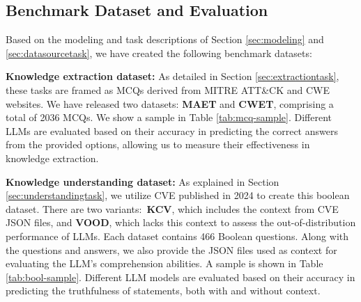 \documentclass[conference]{IEEEtran}
\begin{document}
\subsection{Benchmark Dataset and Evaluation}
Based on the modeling and task descriptions of Section \ref{sec:modeling} and \ref{sec:datasourcetask}, we have created the following benchmark datasets:

\textbf{Knowledge extraction dataset:} As detailed in Section \ref{sec:extractiontask}, these tasks are framed as MCQs derived from MITRE ATT\&CK and CWE websites. We have released two datasets: \textbf{MAET} and \textbf{CWET}, comprising a total of 2036 MCQs. We show a sample in Table \ref{tab:mcq-sample}. Different LLMs are evaluated based on their accuracy in predicting the correct answers from the provided options, allowing us to measure their effectiveness in knowledge extraction.

\begin{table}[]
\caption{Sample from KCV and VOOD dataset}
\label{tab:bool-sample}
\centering
{}
\end{table}

\textbf{Knowledge understanding dataset:} As explained in Section \ref{sec:understandingtask}, we utilize CVE published in 2024 to create this boolean dataset. There are two variants:~\textbf{KCV}, which includes the context from CVE JSON files, and \textbf{VOOD}, which lacks this context to assess the out-of-distribution performance of LLMs. Each dataset contains 466 Boolean questions. Along with the questions and answers, we also provide the JSON files used as context for evaluating the LLM's comprehension abilities. A sample is shown in Table \ref{tab:bool-sample}. Different LLM models are evaluated based on their accuracy in predicting the truthfulness of statements, both with and without context.
\end{document}
